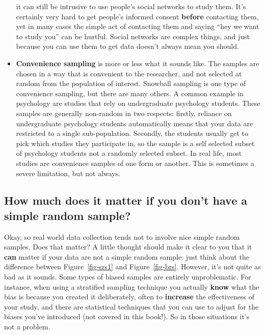 \documentclass[
  letterpaper,
  DIV=11,
  numbers=noendperiod]{scrreprt}
\begin{document}
\begin{itemize}
  it can still be intrusive to use people's social networks to study
  them. It's certainly very hard to get people's informed consent
  \textbf{before} contacting them, yet in many cases the simple act of
  contacting them and saying ``hey we want to study you'' can be
  hurtful. Social networks are complex things, and just because you can
  use them to get data doesn't always mean you should.
\item
  \textbf{Convenience sampling} is more or less what it sounds like. The
  samples are chosen in a way that is convenient to the researcher, and
  not selected at random from the population of interest. Snowball
  sampling is one type of convenience sampling, but there are many
  others. A common example in psychology are studies that rely on
  undergraduate psychology students. These samples are generally
  non-random in two respects: firstly, reliance on undergraduate
  psychology students automatically means that your data are restricted
  to a single sub-population. Secondly, the students usually get to pick
  which studies they participate in, so the sample is a self selected
  subset of psychology students not a randomly selected subset. In real
  life, most studies are convenience samples of one form or another.
  This is sometimes a severe limitation, but not always.
\end{itemize}

\subsection{How much does it matter if you don't have a simple random
sample?}\label{how-much-does-it-matter-if-you-dont-have-a-simple-random-sample}

Okay, so real world data collection tends not to involve nice simple
random samples. Does that matter? A little thought should make it clear
to you that it \textbf{can} matter if your data are not a simple random
sample: just think about the difference between Figure~\ref{fig-srs1}
and Figure~\ref{fig-brs}. However, it's not quite as bad as it sounds.
Some types of biased samples are entirely unproblematic. For instance,
when using a stratified sampling technique you actually \textbf{know}
what the bias is because you created it deliberately, often to
\textbf{increase} the effectiveness of your study, and there are
statistical techniques that you can use to adjust for the biases you've
introduced (not covered in this book!). So in those situations it's not
a problem.
\end{document}
